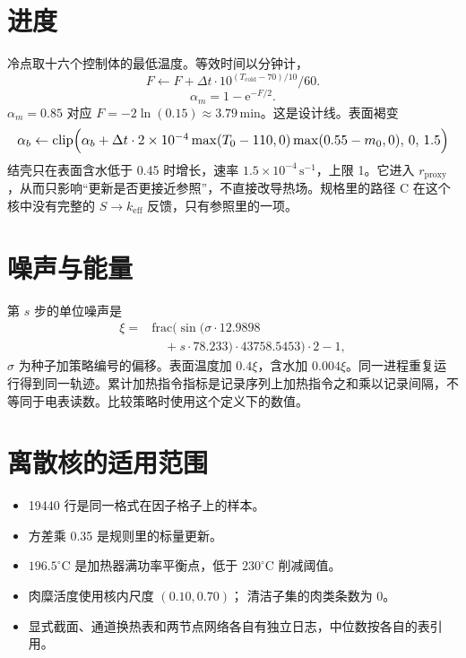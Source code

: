 \section{进度}

冷点取十六个控制体的最低温度。等效时间以分钟计，
\begin{equation}
F\leftarrow F+\Delta t\cdot 10^{(T_{\mathrm{cold}}-70)/10}/60.
\end{equation}
\begin{equation}
\alpha_m=1-\mathrm{e}^{-F/2}.
\end{equation}
\(\alpha_m=0.85\) 对应 \(F=-2\ln(0.15)\approx 3.79\,\mathrm{min}\)。这是设计线。表面褐变
\begin{equation}
\resizebox{\columnwidth}{!}{$
\alpha_b\leftarrow\mathrm{clip}\Big(\alpha_b+\Delta t\cdot 2\times 10^{-4}
\max(T_0-110,0)\max(0.55-m_0,0),\,0,\,1.5\Big)
$}
\end{equation}
结壳只在表面含水低于 0.45 时增长，速率 \(1.5\times 10^{-4}\,\mathrm{s}^{-1}\)，上限 1。它进入 \(r_{\mathrm{proxy}}\)，从而只影响“更新是否更接近参照”，不直接改导热场。规格里的路径 C 在这个核中没有完整的 \(S\to k_{\mathrm{eff}}\) 反馈，只有参照里的一项。

\section{噪声与能量}

第 \(s\) 步的单位噪声是
\begin{equation}
\label{eq:hash}
\begin{aligned}
\xi={}&\mathrm{frac}\Big(\sin\Big(\sigma\cdot 12.9898\\
&\quad+s\cdot 78.233\Big)\cdot 43758.5453\Big)\cdot 2-1,
\end{aligned}
\end{equation}
\(\sigma\) 为种子加策略编号的偏移。表面温度加 \(0.4\xi\)，含水加 \(0.004\xi\)。同一进程重复运行得到同一轨迹。累计加热指令指标是记录序列上加热指令之和乘以记录间隔，不等同于电表读数。比较策略时使用这个定义下的数值。

\section{离散核的适用范围}

\begin{itemize}
\item 19440 行是同一格式在因子格子上的样本。
\item 方差乘 0.35 是规则里的标量更新。
\item \(196.5^\circ\mathrm{C}\) 是加热器满功率平衡点，低于 \(230^\circ\mathrm{C}\) 削减阈值。
\item 肉糜活度使用核内尺度 \((0.10,0.70)\)；\cite{sorption2026} 清洁子集的肉类条数为 0。
\item 显式截面、通道换热表和两节点网络各自有独立日志，中位数按各自的表引用。
\end{itemize}
